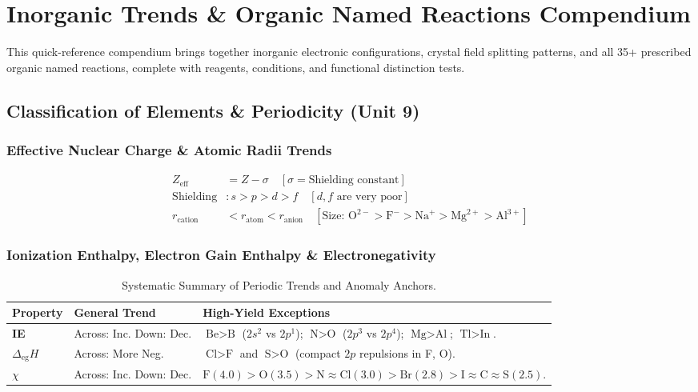 \documentclass[10pt,twoside,openright]{book}
\begin{document}
\chapter{Inorganic Trends \& Organic Named Reactions Compendium}

This quick-reference compendium brings together inorganic electronic configurations, crystal field splitting patterns, and all 35+ prescribed organic named reactions, complete with reagents, conditions, and functional distinction tests.

\section{Classification of Elements \& Periodicity (Unit 9)}

\subsection{Effective Nuclear Charge \& Atomic Radii Trends}

\begin{formulabox}
\begin{align}
  Z_{\text{eff}} &= Z - \sigma \quad [\sigma = \text{Shielding constant}] \\
  \text{Shielding} &: s > p > d > f \quad [d, f\text{ are very poor}] \\
  r_{\text{cation}} &< r_{\text{atom}} < r_{\text{anion}} \quad \left[\text{Size: } \text{O}^{2-} > \text{F}^- > \text{Na}^+ > \text{Mg}^{2+} > \text{Al}^{3+}\right]
\end{align}
\end{formulabox}

\subsection{Ionization Enthalpy, Electron Gain Enthalpy \& Electronegativity}

\begin{table}[htbp]
\centering
\small
\renewcommand{\arraystretch}{1.2}
{\fontsize{7.5pt}{9.0pt}\selectfont\setlength{\tabcolsep}{1.5pt}
\begin{tabularx}{\linewidth}{l >{\RaggedRight}X >{\RaggedRight}X}
\toprule
\textbf{Property} & \textbf{General Trend} & \textbf{High-Yield Exceptions} \\
\midrule
\textbf{IE} & Across: Inc. \quad Down: Dec. & $\text{Be} > \text{B}$ ($2s^2$ vs $2p^1$); $\text{N} > \text{O}$ ($2p^3$ vs $2p^4$); $\text{Mg} > \text{Al}$; $\text{Tl} > \text{In}$. \\
\textbf{$\Delta_{\text{eg}}H$} & Across: More Neg. & $\text{Cl} > \text{F}$ and $\text{S} > \text{O}$ (compact $2p$ repulsions in F, O). \\
\textbf{$\chi$} & Across: Inc. \quad Down: Dec. & $\text{F} (4.0) > \text{O} (3.5) > \text{N} \approx \text{Cl} (3.0) > \text{Br} (2.8) > \text{I} \approx \text{C} \approx \text{S} (2.5)$. \\
\bottomrule
\end{tabularx}}
\caption{Systematic Summary of Periodic Trends and Anomaly Anchors.}
\end{table}
\end{document}
